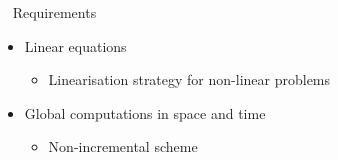 \documentclass[aspectratio=1610]{beamer}
\begin{document}
\begin{frame}
\begin{minipage}{0.45\linewidth}
\begin{figure}
			\end{figure}
			\vspace{10pt}
			\begin{orangeblockshadow}{\faCogs ~ Requirements}
				\begin{itemize}
					\item Linear equations
					\begin{itemize}
						\item Linearisation strategy for non-linear problems
					\end{itemize}
					\item Global computations in space and time
					\begin{itemize}
						\item Non-incremental scheme
					\end{itemize}
				\end{itemize}
			\end{orangeblockshadow}
		\end{minipage}
		
	\end{frame}
	
	
		
	
\end{document}
